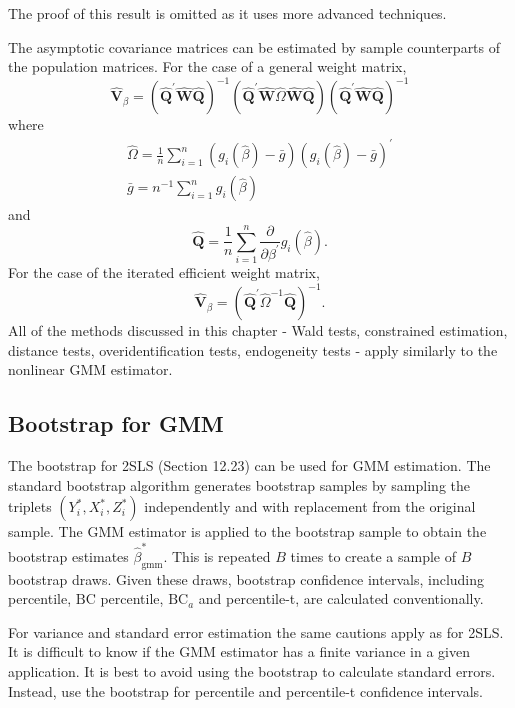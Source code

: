 \documentclass[10pt]{article}
\begin{document}
The proof of this result is omitted as it uses more advanced techniques.

The asymptotic covariance matrices can be estimated by sample counterparts of the population matrices. For the case of a general weight matrix,
$$
\widehat{\boldsymbol{V}}_{\beta}=\left(\widehat{\boldsymbol{Q}}^{\prime} \widehat{\boldsymbol{W}} \widehat{\boldsymbol{Q}}\right)^{-1}\left(\widehat{\boldsymbol{Q}}^{\prime} \widehat{\boldsymbol{W}} \widehat{\Omega} \widehat{\boldsymbol{W}} \widehat{\boldsymbol{Q}}\right)\left(\widehat{\boldsymbol{Q}}^{\prime} \widehat{\boldsymbol{W}} \widehat{\boldsymbol{Q}}\right)^{-1}
$$
where
$$
\begin{gathered}
\widehat{\Omega}=\frac{1}{n} \sum_{i=1}^{n}\left(g_{i}(\widehat{\beta})-\bar{g}\right)\left(g_{i}(\widehat{\beta})-\bar{g}\right)^{\prime} \\
\bar{g}=n^{-1} \sum_{i=1}^{n} g_{i}(\widehat{\beta})
\end{gathered}
$$
and
$$
\widehat{\boldsymbol{Q}}=\frac{1}{n} \sum_{i=1}^{n} \frac{\partial}{\partial \beta^{\prime}} g_{i}(\widehat{\beta}) .
$$
For the case of the iterated efficient weight matrix,
$$
\widehat{\boldsymbol{V}}_{\beta}=\left(\widehat{\boldsymbol{Q}}^{\prime} \widehat{\Omega}^{-1} \widehat{\boldsymbol{Q}}\right)^{-1} .
$$
All of the methods discussed in this chapter - Wald tests, constrained estimation, distance tests, overidentification tests, endogeneity tests - apply similarly to the nonlinear GMM estimator.

\subsection{Bootstrap for GMM}
The bootstrap for 2SLS (Section 12.23) can be used for GMM estimation. The standard bootstrap algorithm generates bootstrap samples by sampling the triplets $\left(Y_{i}^{*}, X_{i}^{*}, Z_{i}^{*}\right)$ independently and with replacement from the original sample. The GMM estimator is applied to the bootstrap sample to obtain the bootstrap estimates $\widehat{\beta}_{\mathrm{gmm}}^{*}$. This is repeated $B$ times to create a sample of $B$ bootstrap draws. Given these draws, bootstrap confidence intervals, including percentile, $\mathrm{BC}$ percentile, $\mathrm{BC}_{a}$ and percentile-t, are calculated conventionally.

For variance and standard error estimation the same cautions apply as for 2SLS. It is difficult to know if the GMM estimator has a finite variance in a given application. It is best to avoid using the bootstrap to calculate standard errors. Instead, use the bootstrap for percentile and percentile-t confidence intervals.
\end{document}

